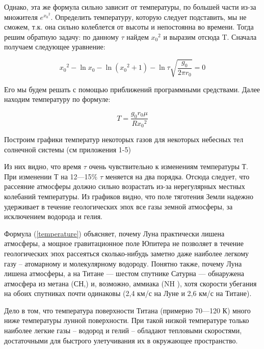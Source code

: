 \documentclass[a4paper,12pt]{article}
\begin{document}
Однако, эта же формула сильно зависит от температуры, по большей части из-за множителя $e^{{x_0}^2}$. Определить температуру, которую следует подставить, мы не сможем, т.к. она сильно колеблется от высоты и непостоянна во времени. Тогда решим обратную задачу: по данному $\tau$ найдем ${{x_0}^2}$ и выразим отсюда T. Сначала получаем следующее уравнение:

\begin{equation}\label{uravn}
	{x_0}^2 - \ln x_0 - \ln{({x_0}^2 + 1)} - \ln{\tau\sqrt{\frac{g_0}{2\pi r_0}}} = 0
\end{equation}

Его мы будем решать с помощью приближений программными средствами. Далее находим температуру по формуле:

\begin{equation}\label{temperature}
	T = \frac{g_0r_0\mu}{R{x_0}^2}
\end{equation}


Построим графики температур некоторых газов для некоторых небесных тел солнечной системы (см приложения 1-5)

Из них видно, что время $\tau$ очень чувствительно к изменениям температуры Т. При изменении Т на 12—15$\%$ $\tau$ меняется на два порядка. Отсюда следует, что рассеяние атмосфе­ры должно сильно возрастать из-за нерегулярных местных колебаний темпе­ратуры. Из графиков видно, что поле тяготения Земли надежно удерживает в течение геологи­ческих эпох все газы земной атмосферы, за исключением водорода и гелия.

Формула (\ref{temperature}) объясняет, почему Луна практически лишена атмосферы, а мощное гравитационное поле Юпитера не позволяет в течение геологиче­ских эпох рассеяться сколько-нибудь заметно даже наиболее легкому газу -- атомарному и молекулярному водороду. Понятно также, почему Луна лишена атмосферы, а на Титане — шестом спутнике Сатурна — обнаружена атмосфера из метана (СН,) и, возможно, аммиака (NH ), хотя скорости убегания на обоих спутниках почти одинаковы (2,4 км/с на Луне и 2,6 км/с на Титане).

Дело в том, что температура поверхности Титана (примерно 70—120 К) много ниже температуры лунной поверхности. При такой низкой темпера­туре только наиболее легкие газы -- водород и гелий -- обладают тепловыми
скоростями, достаточными для быстрого улетучивания их в окружающее
пространство.

  
\end{document}
